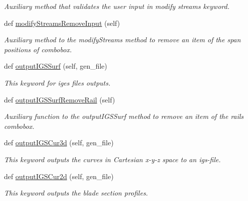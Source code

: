 \begin{DoxyCompactItemize}
\begin{DoxyCompactList}\small\item\em Auxiliary method that validates the user input in modify streams keyword. \end{DoxyCompactList}\item 
def \hyperlink{classbladepro__modules_1_1inputfile__writer_1_1_input_writer_window_ade4195a752861e46586e7b163136620f}{modify\+Streams\+Remove\+Input} (self)
\begin{DoxyCompactList}\small\item\em Auxiliary method to the modify\+Streams method to remove an item of the span positions of combobox. \end{DoxyCompactList}\item 
def \hyperlink{classbladepro__modules_1_1inputfile__writer_1_1_input_writer_window_ada62706610465b6ba0d6fe5070cdbb9c}{output\+I\+G\+S\+Surf} (self, gen\+\_\+file)
\begin{DoxyCompactList}\small\item\em This keyword for iges files outputs. \end{DoxyCompactList}\item 
def \hyperlink{classbladepro__modules_1_1inputfile__writer_1_1_input_writer_window_ae5847a1434bc82a396cebfb20911db56}{output\+I\+G\+S\+Surf\+Remove\+Rail} (self)
\begin{DoxyCompactList}\small\item\em Auxiliary function to the output\+I\+G\+S\+Surf method to remove an item of the rails combobox. \end{DoxyCompactList}\item 
def \hyperlink{classbladepro__modules_1_1inputfile__writer_1_1_input_writer_window_a394d61e8d66fde036f84746086d6c687}{output\+I\+G\+S\+Cur3d} (self, gen\+\_\+file)
\begin{DoxyCompactList}\small\item\em This keyword outputs the curves in Cartesian x-\/y-\/z space to an igs-\/file. \end{DoxyCompactList}\item 
def \hyperlink{classbladepro__modules_1_1inputfile__writer_1_1_input_writer_window_ace84b07ce1416a3535068da6baa2e7d3}{output\+I\+G\+S\+Cur2d} (self, gen\+\_\+file)
\begin{DoxyCompactList}\small\item\em This keyword outputs the blade section profiles. \end{DoxyCompactList}\item 

\end{DoxyCompactItemize}
